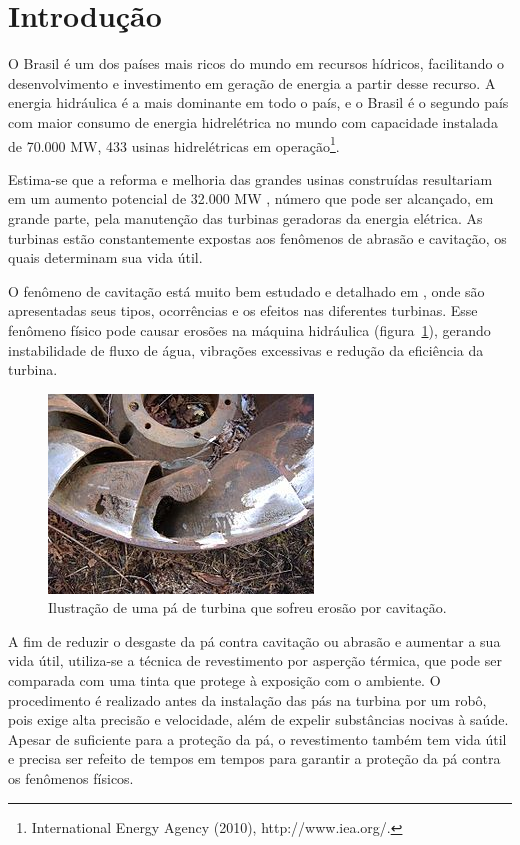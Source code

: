 \section{Introdução}
O Brasil é um dos países mais ricos do mundo em recursos hídricos, facilitando o
desenvolvimento e investimento em geração de energia a partir desse recurso. A
energia hidráulica é a mais dominante em todo o país, e o Brasil é o segundo
país com maior consumo de energia hidrelétrica no mundo com capacidade
instalada de 70.000 MW, 433 usinas hidrelétricas em
operação\footnote{International Energy Agency (2010), http://www.iea.org/.}.

Estima-se que a reforma e melhoria das grandes usinas construídas resultariam
em um aumento potencial de 32.000 MW \citep{goldemberg2007energia},
número que pode ser alcançado, em grande parte, pela manutenção das turbinas
geradoras da energia elétrica. As turbinas estão constantemente expostas aos
fenômenos de abrasão e cavitação, os quais determinam sua vida útil.

O fenômeno de cavitação está muito bem estudado e detalhado em
\cite{escaler2006detection}, onde são apresentadas seus tipos, ocorrências e os
efeitos nas diferentes turbinas. Esse fenômeno físico pode causar erosões na
máquina hidráulica (figura~\ref{fig::cavitacao}), gerando instabilidade de fluxo
de água, vibrações excessivas e redução da eficiência da turbina.

\begin{figure}[h!]
	\centering	
	\includegraphics[width=0.7\columnwidth]{sota/figs/intro/cavitacao}
	\caption{Ilustração de uma pá de turbina que sofreu erosão por cavitação.}
	\label{fig::cavitacao}
\end{figure}

A fim de reduzir o desgaste da pá contra cavitação ou abrasão e aumentar a sua
vida útil, utiliza-se a técnica de revestimento por asperção térmica, que pode ser comparada com uma
tinta que protege à exposição com o ambiente. O procedimento é realizado
antes da instalação das pás na turbina por um robô, pois exige alta precisão
e velocidade, além de expelir substâncias nocivas à saúde. Apesar de suficiente para a proteção da pá, o
revestimento também tem vida útil e precisa ser refeito de tempos em tempos para
garantir a proteção da pá contra os fenômenos físicos.

